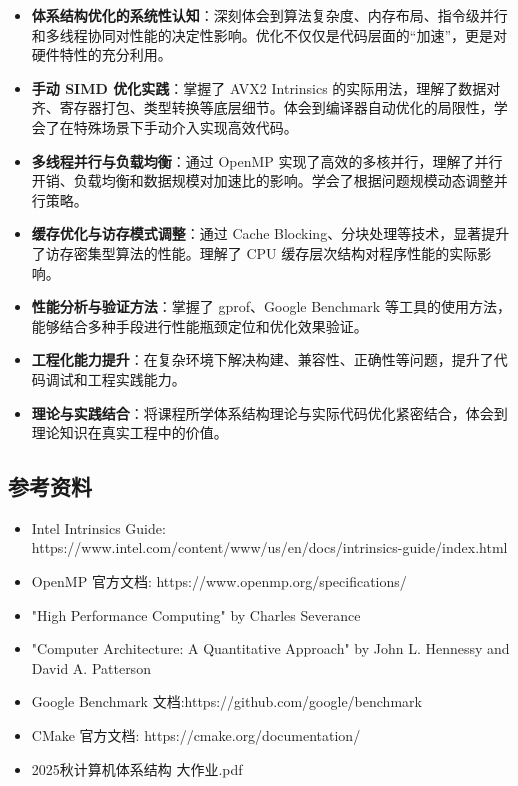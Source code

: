 \documentclass[a4paper]{article}
\begin{document}
\begin{itemize}
    \item \textbf{体系结构优化的系统性认知}：深刻体会到算法复杂度、内存布局、指令级并行和多线程协同对性能的决定性影响。优化不仅仅是代码层面的“加速”，更是对硬件特性的充分利用。
    \item \textbf{手动 SIMD 优化实践}：掌握了 AVX2 Intrinsics 的实际用法，理解了数据对齐、寄存器打包、类型转换等底层细节。体会到编译器自动优化的局限性，学会了在特殊场景下手动介入实现高效代码。
    \item \textbf{多线程并行与负载均衡}：通过 OpenMP 实现了高效的多核并行，理解了并行开销、负载均衡和数据规模对加速比的影响。学会了根据问题规模动态调整并行策略。
    \item \textbf{缓存优化与访存模式调整}：通过 Cache Blocking、分块处理等技术，显著提升了访存密集型算法的性能。理解了 CPU 缓存层次结构对程序性能的实际影响。
    \item \textbf{性能分析与验证方法}：掌握了 gprof、Google Benchmark 等工具的使用方法，能够结合多种手段进行性能瓶颈定位和优化效果验证。
    \item \textbf{工程化能力提升}：在复杂环境下解决构建、兼容性、正确性等问题，提升了代码调试和工程实践能力。
    \item \textbf{理论与实践结合}：将课程所学体系结构理论与实际代码优化紧密结合，体会到理论知识在真实工程中的价值。
\end{itemize}

\subsection{参考资料}
\begin{itemize}
    \item Intel Intrinsics Guide: https://www.intel.com/content/www/us/en/docs/intrinsics-guide/index.html
    \item OpenMP 官方文档: https://www.openmp.org/specifications/
    \item "High Performance Computing" by Charles Severance
    \item "Computer Architecture: A Quantitative Approach" by John L. Hennessy and David A. Patterson
    \item Google Benchmark 文档:https://github.com/google/benchmark
    \item CMake 官方文档: https://cmake.org/documentation/
    \item 2025秋计算机体系结构 大作业.pdf
\end{itemize}
\label{LastPage}
\end{document}
